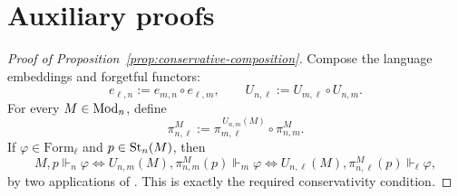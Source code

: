 \appendix
\section{Auxiliary proofs}\label{app:deferred-proofs}

\begin{proof}[Proof of Proposition~\ref{prop:conservative-composition}]
Compose the language embeddings and forgetful functors:
\[
e_{\ell,n}:=e_{m,n}\circ e_{\ell,m},
\qquad
U_{n,\ell}:=U_{m,\ell}\circ U_{n,m}.
\]
For every $M\in\mathrm{Mod}_n$, define
\[
\pi^M_{n,\ell}:=
\pi^{\,U_{n,m}(M)}_{m,\ell}\circ \pi^M_{n,m}.
\]
If $\varphi\in\mathrm{Form}_\ell$ and $p\in\mathrm{St}_n(M)$, then
\[
M,p\Vdash_n\varphi
\Longleftrightarrow
U_{n,m}(M),\pi^M_{n,m}(p)\Vdash_m\varphi
\Longleftrightarrow
U_{n,\ell}(M),\pi^M_{n,\ell}(p)\Vdash_\ell\varphi,
\]
by two applications of . This is exactly the required conservativity condition.
\end{proof}

\endinput
